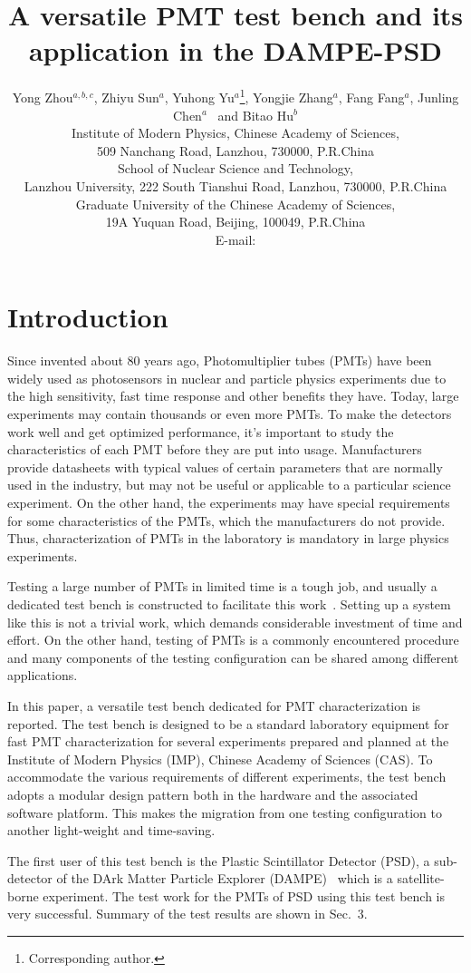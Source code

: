 \documentclass{JINST}
\title{A versatile PMT test bench and its application in the DAMPE-PSD}
\author{Yong Zhou$^{a,b,c}$,
Zhiyu Sun$^a$,
Yuhong Yu$^a$\thanks{Corresponding author.},
Yongjie Zhang$^a$,
Fang Fang$^a$,
Junling Chen$^a$~
and Bitao Hu$^b$\\
\llap{$^a$}Institute of Modern Physics, Chinese Academy of Sciences,\\
           509 Nanchang Road, Lanzhou, 730000, P.R.China\\
\llap{$^b$}School of Nuclear Science and Technology,\\
           Lanzhou University, 222 South Tianshui Road, Lanzhou, 730000, P.R.China\\
\llap{$^c$}Graduate University of the Chinese Academy of Sciences,\\
           19A Yuquan Road, Beijing, 100049, P.R.China\\
E-mail: \email{yuyuhong@impcas.ac.cn}}
\begin{document}
\section{Introduction}
\label{sec:introduction}

Since invented about 80 years ago, Photomultiplier tubes (PMTs) have been widely used as photosensors in nuclear and particle physics experiments due to the high sensitivity, fast time response and other benefits they have. 
Today, large experiments may contain thousands or even more PMTs. To make the detectors work well and get optimized performance, it's important to study the characteristics of each PMT before they are put into usage. 
Manufacturers provide datasheets with typical values of certain parameters that are normally used in the industry, but may not be useful or applicable to a particular science experiment.
On the other hand, the experiments may have special requirements for some characteristics of the PMTs, which the manufacturers do not provide. 
Thus, characterization of PMTs in the laboratory is mandatory in large physics experiments.

Testing a large number of PMTs in limited time is a tough job, and usually a dedicated test bench is constructed to facilitate this work~\cite{barnhill_testing_2008,akgun_complete_2005,adragna_pmt-block_2006}.
Setting up a system like this is not a trivial work, which demands considerable investment of time and effort.
On the other hand, testing of PMTs is a commonly encountered procedure and many components of the testing configuration can be shared among different applications.

In this paper, a versatile test bench dedicated for PMT characterization is reported.
The test bench is designed to be a standard laboratory equipment for fast PMT characterization for several experiments prepared and planned at the Institute of Modern Physics (IMP), Chinese Academy of Sciences (CAS).
To accommodate the various requirements of different experiments, the test bench adopts a modular design pattern both in the hardware and the associated software platform.
This makes the migration from one testing configuration to another light-weight and time-saving.

The first user of this test bench is the Plastic Scintillator Detector (PSD), a sub-detector of the DArk Matter Particle Explorer (DAMPE)~\cite{Chang_Jin_dampe} which is a satellite-borne experiment. 
The test work for the PMTs of PSD using this test bench is very successful. Summary of the test results are shown in Sec.~3.
\end{document}

